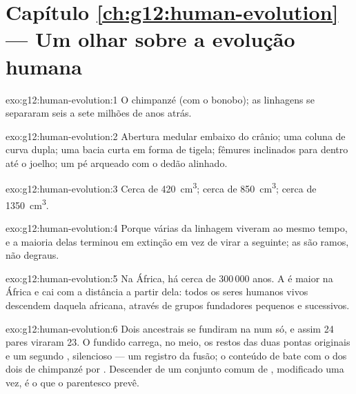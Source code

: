 \section*{Capítulo \ref{ch:g12:human-evolution} --- Um olhar sobre a evolução humana}

\begin{solution}{exo:g12:human-evolution:1}
O chimpanzé (com o bonobo); as linhagens se separaram seis a sete
milhões de anos atrás.
\end{solution}

\begin{solution}{exo:g12:human-evolution:2}
Abertura medular embaixo do crânio; uma coluna de curva dupla; uma
bacia curta em forma de tigela; fêmures inclinados para dentro até o
joelho; um pé arqueado com o dedão alinhado.
\end{solution}

\begin{solution}{exo:g12:human-evolution:3}
Cerca de \qty{420}{cm^3}; cerca de \qty{850}{cm^3}; cerca de \qty{1350}{cm^3}.
\end{solution}

\begin{solution}{exo:g12:human-evolution:4}
Porque várias  da linhagem viveram ao mesmo tempo, e a maioria
delas terminou em extinção em vez de virar a seguinte; as  são
ramos, não degraus.
\end{solution}

\begin{solution}{exo:g12:human-evolution:5}
Na África, há cerca de 300\,000 anos. A  é maior na
África e cai com a distância a partir dela: todos os seres humanos
vivos descendem daquela  africana, através de grupos
fundadores pequenos e sucessivos.
\end{solution}

\begin{solution}{exo:g12:human-evolution:6}
Dois  ancestrais se fundiram na  num só, e
assim 24 pares viraram 23. O  fundido carrega, no meio, os
restos das duas pontas originais e um segundo , silencioso
--- um registro da fusão; o conteúdo de  bate com o dos dois
 de chimpanzé  por . Descender de um conjunto comum
de , modificado uma vez, é o que o parentesco prevê.
\end{solution}

